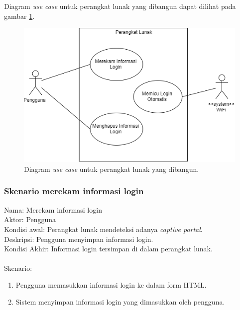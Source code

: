 Diagram \textit{use case} untuk perangkat lunak yang dibangun dapat dilihat pada gambar \ref{fig:usecase}.

\begin{figure}[h]
    \centering
    \includegraphics[scale=0.6]{Gambar/usecase.png}
    \caption[Diagram \textit{use case} untuk perangkat lunak yang dibangun.]{Diagram \textit{use case} untuk perangkat lunak yang dibangun.}
    \label{fig:usecase}
\end{figure}

\subsubsection{Skenario merekam informasi login}
Nama: Merekam informasi login\\
Aktor: Pengguna\\
Kondisi awal: Perangkat lunak mendeteksi adanya \textit{captive portal}.\\
Deskripsi: Pengguna menyimpan informasi login.\\
Kondisi Akhir: Informasi login tersimpan di dalam perangkat lunak.\\\\
Skenario:
\begin{enumerate}
    \item{Pengguna memasukkan informasi login ke dalam form HTML.}
    \item{Sistem menyimpan informasi login yang dimasukkan oleh pengguna.}
\end{enumerate}

